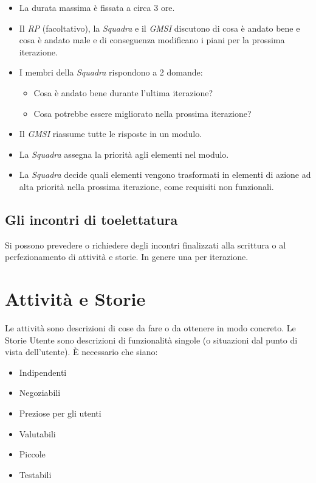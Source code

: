 \begin{itemize}
  \item La durata massima \`e fissata a circa 3 ore.
  \item Il \textit{RP} (facoltativo), la \textit{Squadra} e il \textit{GMSI} discutono di cosa \`e andato bene e cosa \`e andato male e di conseguenza modificano i piani per la prossima iterazione.
  \item I membri della \textit{Squadra} rispondono a 2 domande:
  \begin{itemize}
    \item Cosa \`e andato bene durante l'ultima iterazione?
    \item Cosa potrebbe essere migliorato nella prossima iterazione?
  \end{itemize}
  \item Il \textit{GMSI} riassume tutte le risposte in un modulo.
  \item La \textit{Squadra} assegna la priorità agli elementi nel modulo.
  \item La \textit{Squadra} decide quali elementi vengono trasformati in elementi di azione ad alta priorit\`a nella prossima iterazione, come requisiti non funzionali.
\end{itemize}

\subsection{Gli incontri di toelettatura}

Si possono prevedere o richiedere degli incontri finalizzati alla scrittura o al perfezionamento di attivit\`a e storie. In genere una per iterazione.

\section{Attivit\`a e Storie}

Le attivit\`a sono descrizioni di cose da fare o da ottenere in modo concreto.
Le Storie Utente sono descrizioni di funzionalit\`a singole (o situazioni dal punto di vista dell'utente). \`E necessario che siano:
\begin{itemize}
  \item Indipendenti
  \item Negoziabili
  \item Preziose per gli utenti
  \item Valutabili
  \item Piccole
  \item Testabili
\end{itemize}

